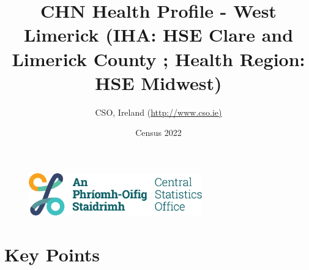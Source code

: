 \documentclass{article}
\title{CHN Health Profile - West Limerick (IHA: HSE Clare and Limerick County ;  Health Region: HSE Midwest) }
\date{Census 2022}
\author{CSO, Ireland  (\url{http://www.cso.ie)}}
\begin{document}


\begin{figure}
	\centering
\includegraphics[width =75mm]{../figures/CSO_Logo.png}
\end{figure}

				 
		   
						  
														  
																																													
												 
			 
\maketitle
					
													   
				 
						 
																																																																											   
				 
				  
  \pagebreak
    	    \tableofcontents

\pagebreak


\section{Key Points}
\end{document}
